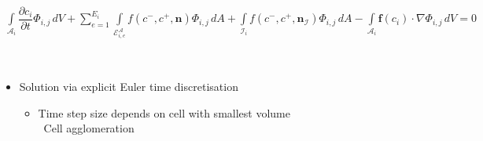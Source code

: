 \begin{frame}
{\begin{minipage}{\the\textwidth}
				\begin{align*}
				\int\limits_{\mathcal{A}_i} \dfrac{\partial c_i}{\partial t}\Phi_{i,j} \, dV +
				\sum_{e=1}^{E_i}\int\limits_{\mathcal{E}_{i,e}^\mathcal{A}} f \left( c^-, c^+, \mathbf{n} \right) \Phi_{i,j} \, dA + \int\limits_{\mathcal{I}_{i}} f \left( c^-, c^+, \mathbf{n}_\mathcal{I} \right) \Phi_{i,j} \, dA - \int\limits_{\mathcal{A}_i} \boldsymbol{f}\left(c_i\right) \cdot \nabla\Phi_{i,j} \, dV = 0 
				\end{align*}
			\end{minipage}
			}\\
			\pause
			\begin{itemize}
				\item Solution via explicit Euler time discretisation
					\begin{itemize}
						\item Time step size depends on cell with smallest volume \\
						\MVRightarrow \, Cell agglomeration
					\end{itemize}
			\end{itemize}
	\end{frame}
